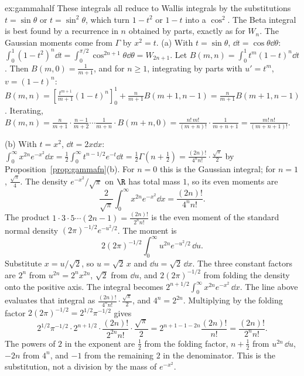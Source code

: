 \begin{solution}{ex:gammahalf}
\idea These integrals all reduce to Wallis integrals by the substitutions $t=\sin\theta$ or $t=\sin^2\theta$, which turn $1-t^2$ or $1-t$ into a $\cos^2$. The Beta integral is best found by a recurrence in $n$ obtained by parts, exactly as for $W_n$. The Gaussian moments come from $\Gamma$ by $x^2=t$.
\writeup (a) With $t=\sin\theta$, $\dd t=\cos\theta\dd\theta$: $\int_0^1(1-t^2)^n\dd t=\int_0^{\pi/2}\cos^{2n+1}\theta\dd\theta=W_{2n+1}$.
Let $B(m,n)=\int_0^1t^m(1-t)^n\dd t$. Then $B(m,0)=\frac1{m+1}$, and for $n\ge1$, integrating by parts with $u'=t^m$, $v=(1-t)^n$: $B(m,n)=\left[\frac{t^{m+1}}{m+1}(1-t)^n\right]_0^1+\frac n{m+1}B(m+1,n-1)=\frac n{m+1}B(m+1,n-1)$. Iterating, $B(m,n)=\frac{n}{m+1}\cdot\frac{n-1}{m+2}\cdots\frac1{m+n}\cdot B(m+n,0)=\frac{n!\,m!}{(m+n)!}\cdot\frac1{m+n+1}=\frac{m!\,n!}{(m+n+1)!}$.

(b) With $t=x^2$, $\dd t=2x\dd x$: $\int_0^\infty x^{2n}e^{-x^2}\dd x=\frac12\int_0^\infty t^{n-1/2}e^{-t}\dd t=\frac12\Gamma\left(n+\frac12\right)=\frac{(2n)!}{4^nn!}\cdot\frac{\sqrt\pi}2$ by Proposition~\ref{prop:gammafn}(b). For $n=0$ this is the Gaussian integral; for $n=1$, $\frac{\sqrt\pi}4$. The density $e^{-x^2}/\sqrt\pi$ on $\R$ has total mass $1$, so its even moments are
\[
\frac{2}{\sqrt\pi}\int_0^\infty x^{2n}e^{-x^2}\dd x=\frac{(2n)!}{4^nn!}.
\]
The product $1\cdot3\cdot5\cdots(2n-1)=\frac{(2n)!}{2^nn!}$ is the even moment of the standard normal density $(2\pi)^{-1/2}e^{-u^2/2}$. The moment is
\[
2(2\pi)^{-1/2}\int_0^\infty u^{2n}e^{-u^2/2}\,\dd u.
\]
Substitute $x=u/\sqrt2$, so $u=\sqrt2\,x$ and $\dd u=\sqrt2\,\dd x$. The three constant factors are $2^n$ from $u^{2n}=2^nx^{2n}$, $\sqrt2$ from $\dd u$, and $2(2\pi)^{-1/2}$ from folding the density onto the positive axis. The integral becomes $2^{n+1/2}\int_0^\infty x^{2n}e^{-x^2}\,\dd x$. The line above evaluates that integral as $\frac{(2n)!}{4^nn!}\cdot\frac{\sqrt\pi}2$, and $4^n=2^{2n}$. Multiplying by the folding factor $2(2\pi)^{-1/2}=2^{1/2}\pi^{-1/2}$ gives
\[
2^{1/2}\pi^{-1/2}\cdot 2^{n+1/2}\cdot\frac{(2n)!}{2^{2n}n!}\cdot\frac{\sqrt\pi}2
=2^{n+1-1-2n}\frac{(2n)!}{n!}
=\frac{(2n)!}{2^nn!}.
\]
The powers of $2$ in the exponent are $\frac12$ from the folding factor, $n+\frac12$ from $u^{2n}\,\dd u$, $-2n$ from $4^n$, and $-1$ from the remaining $2$ in the denominator. This is the substitution, not a division by the mass of $e^{-x^2}$.
\end{solution}

